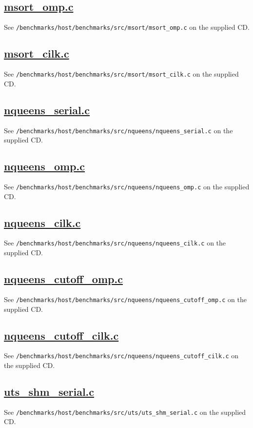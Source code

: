 \documentclass{report}
\newcommand\purl[1]{\protect\url{#1}} %
\begin{document}
\subsection{\purl{msort_omp.c}} \label{App:msortompc}
See \verb!/benchmarks/host/benchmarks/src/msort/msort_omp.c! on the supplied CD.

\subsection{\purl{msort_cilk.c}} \label{App:msortcilkc}
See \verb!/benchmarks/host/benchmarks/src/msort/msort_cilk.c! on the supplied CD.

\subsection{\purl{nqueens_serial.c}} \label{App:nqueensserialc}
See \verb!/benchmarks/host/benchmarks/src/nqueens/nqueens_serial.c! on the supplied CD.

\subsection{\purl{nqueens_omp.c}} \label{App:nqueensompc}
See \verb!/benchmarks/host/benchmarks/src/nqueens/nqueens_omp.c! on the supplied CD.

\subsection{\purl{nqueens_cilk.c}} \label{App:nqueenscilkc}
See \verb!/benchmarks/host/benchmarks/src/nqueens/nqueens_cilk.c! on the supplied CD.

\subsection{\purl{nqueens_cutoff_omp.c}} \label{App:nqueenscutoffompc}
See \verb!/benchmarks/host/benchmarks/src/nqueens/nqueens_cutoff_omp.c! on the supplied CD.

\subsection{\purl{nqueens_cutoff_cilk.c}} \label{App:nqueenscutoffcilkc}
See \verb!/benchmarks/host/benchmarks/src/nqueens/nqueens_cutoff_cilk.c! on the supplied CD.

\subsection{\purl{uts_shm_serial.c}} \label{App:utsshmserialc}
See \verb!/benchmarks/host/benchmarks/src/uts/uts_shm_serial.c! on the supplied CD.
\end{document}
